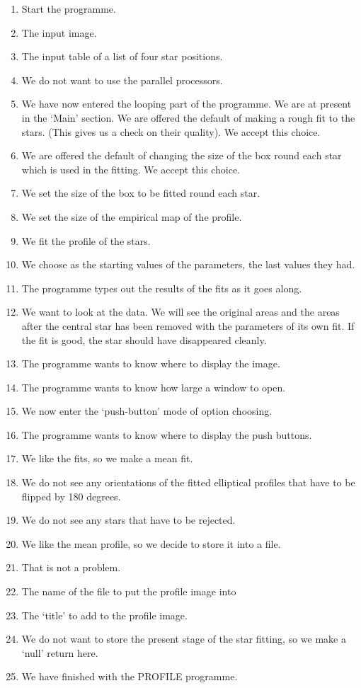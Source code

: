 {{\begin{enumerate}
\item Start the programme.
\item The input image.
\item The input table of a list of four star positions.
\item We do not want to use the parallel processors.
\item We have now entered the looping part of the programme. We are at 
      present in the `Main' section. We are offered the default of making a 
      rough fit to the stars. (This gives us a check on their quality). We 
      accept this choice.
\item We are offered the default of changing the size of the box
      round each star which is used in the fitting. We accept this choice.
\item We set the size of the box to be fitted round each star.
\item We set the size of the empirical map of the profile.
\item We fit the profile of the stars.
\item We choose as the starting values of the parameters, the last
      values they had.
\item The programme types out the results of the fits as it goes
      along.
\item We want to look at the data. We will see the original areas
      and the areas after the central star has been removed with the
      parameters of its own fit. If the fit is good, the star should
      have disappeared cleanly.
\item The programme wants to know where to display the image.
\item The programme wants to know how large a window to open.
\item We now enter the `push-button' mode of option choosing.
\item The programme wants to know where to display the push buttons.
\item We like the fits, so we make a mean fit.
\item We do not see any orientations of the fitted elliptical profiles
      that have to be flipped by 180 degrees.
\item We do not see any stars that have to be rejected.
\item We like the mean profile, so we decide to store it into
      a file.
\item That is not a problem.
\item The name of the file to put the profile image into
\item The `title' to add to the profile image.
\item We do not want to store the present stage of the star fitting,
      so we make a `null' return here.
\item We have finished with the PROFILE programme.
\end{enumerate}

}}
